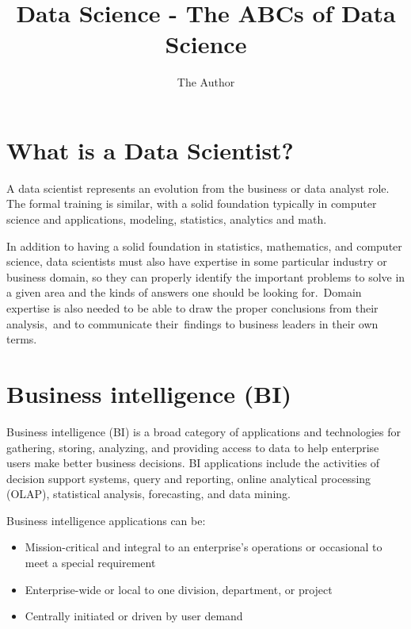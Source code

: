 \documentclass[11pt]{article} %
\title{Data Science - The ABCs of Data Science}
\author{The Author}
\begin{document}
\maketitle

\tableofcontents

\section{What is a Data Scientist?}

A data scientist represents an evolution from the business or data analyst role. The formal training is similar, with a solid foundation typically in computer science and applications, modeling, statistics, analytics and math.

In addition to having a solid foundation in statistics, mathematics, and computer science, data scientists must also have expertise in some particular industry or business domain, so they can properly identify the important problems to solve in a given area and the kinds of answers one should be looking for. Domain expertise is also needed to be able to draw the proper conclusions from their analysis, and to communicate their findings to business leaders in their own terms.


\section{Business intelligence (BI) }


Business intelligence (BI) is a broad category of applications and technologies for gathering, storing, analyzing, and providing access to data to help enterprise users make better business decisions. BI applications include the activities of decision support systems, query and reporting, online analytical processing (OLAP), statistical analysis, forecasting, and data mining.


Business intelligence applications can be:

\begin{itemize}
\item Mission-critical and integral to an enterprise's operations or occasional to meet a special requirement

\item 
Enterprise-wide or local to one division, department, or project

\item
Centrally initiated or driven by user demand
\end{itemize}
\end{document}
